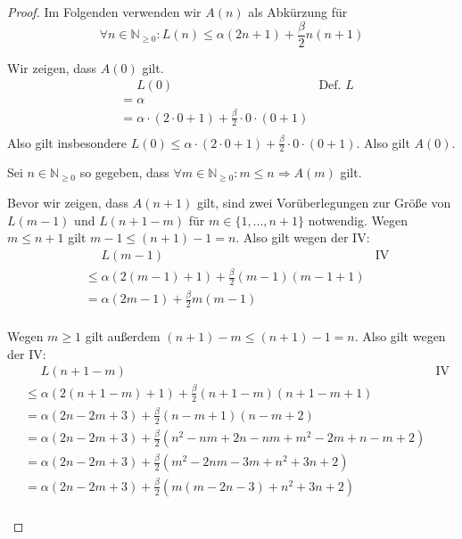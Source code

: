 \documentclass[lang=ngerman, margins=small, extendmath=true]{scrhmwrk}
\begin{document}
\begin{proof} Im Folgenden verwenden wir $A(n)$ als Abkürzung für 
\begin{equation*}
\forall n \in \mathbb{N}_{\geq 0}: L(n) \leq \alpha (2n+1) + \frac{\beta}{2} n (n+1)    
\end{equation*}

\begin{indbase*} Wir zeigen, dass $A(0)$ gilt.
\begin{align*}
& \phantom{{}={}} L(0) & \text{Def. } L \\  & = \alpha & \\
& = \alpha \cdot (2 \cdot 0 + 1) + \frac{\beta}{2} \cdot 0 \cdot (0+1)& \\
\end{align*}
Also gilt insbesondere $L(0) \leq \alpha \cdot (2 \cdot 0 + 1) + \frac{\beta}{2} \cdot 0 \cdot (0+1)$. Also gilt $A(0)$.
\end{indbase*}

\begin{indhyp*}  
Sei $n \in \mathbb{N}_{\geq 0}$ so gegeben, dass $\forall m \in \mathbb{N}_{\geq 0}: m \leq n \Rightarrow A(m)$ gilt.
\end{indhyp*}

\begin{indstep*}
Bevor wir zeigen, dass $A(n+1)$ gilt, sind zwei Vorüberlegungen zur Größe von $L(m-1)$ und $L(n+1-m)$ für $m \in \{1, ..., n+1\}$ notwendig.
Wegen $m \leq n+1$ gilt $m-1 \leq (n+1) - 1 = n$. Also gilt wegen der IV:
\begin{align*}
& \phantom{{}={}} L(m-1) & \text{IV} \\
& \leq \alpha (2(m-1)+1) + \frac{\beta}{2} (m-1) (m-1+1) & \\
& =    \alpha (2m-1) + \frac{\beta}{2} m(m-1) & \tag{i}\\
\end{align*}

Wegen $m \geq 1$ gilt außerdem $(n+1)-m \leq (n+1) - 1 = n$. Also gilt wegen der IV:
\begin{align*}
& \phantom{{}={}} L(n+1-m) & \text{IV} \\
& \leq \alpha (2(n+1-m)+1) + \frac{\beta}{2} (n+1-m) (n+1-m+1) & \\
& = \alpha (2n-2m+3) + \frac{\beta}{2} (n-m+1) (n-m+2) & \\
& = \alpha (2n-2m+3) + \frac{\beta}{2} (n^2 -nm +2n -nm +m^2 -2m +n-m+2) & \\
& = \alpha (2n-2m+3) + \frac{\beta}{2} (m^2 -2nm -3m +n^2 +3n +2) & \\
& = \alpha (2n-2m+3) + \frac{\beta}{2} (m(m-2n-3) +n^2 +3n +2) & \tag{ii}\\
\end{align*}


\end{indstep*}
\end{proof}
\end{document}

